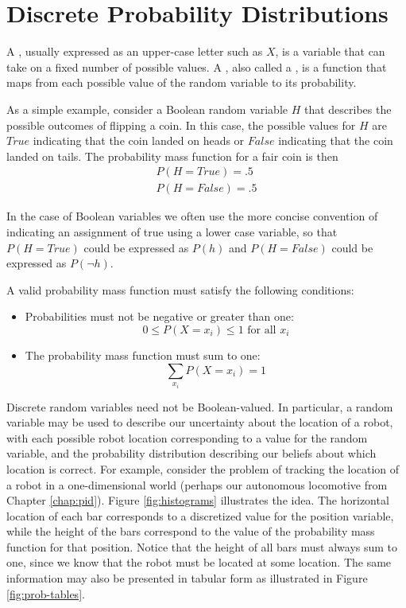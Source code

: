 \section{Discrete Probability Distributions}

A , usually expressed as an upper-case
letter such as $X$, is a variable that can take on a fixed number of
possible values.  A , also called a
, is a function that maps from each
possible value of the random variable to its probability.

As a simple example, consider a Boolean random variable $H$ that
describes the possible outcomes of flipping a coin.  In this case, the
possible values for $H$ are $True$ indicating that the coin landed on
heads or $False$ indicating that the coin landed on tails.  The
probability mass function for a fair coin is then
\begin{align*}
P(H=True) = .5\\
P(H=False) = .5
\end{align*}

In the case of Boolean variables we often use the
more concise convention of indicating an assignment of true using a
lower case variable, so that $P(H=True)$ could be expressed as $P(h)$
and $P(H=False)$ could be expressed as $P(\neg h)$.

A valid probability mass function must satisfy the following
conditions:

\begin{itemize}
\item Probabilities must not be negative or greater than one:
  \[0 \leq P(X = {x_i}) \leq 1 \text{ for all } x_i\]
\item The probability mass function must sum to one:
  \[\sum_{x_i} P(X = {x_i}) = 1\]
\end{itemize}

Discrete random variables need not be Boolean-valued.  In particular,
a random variable may be used to describe our uncertainty about the
location of a robot, with each possible robot location corresponding
to a value for the random variable, and the probability distribution
describing our beliefs about which location is correct. For example,
consider the problem of tracking the location of a robot in a
one-dimensional world (perhaps our autonomous locomotive from Chapter
\ref{chap:pid}).  Figure \ref{fig:histograms} illustrates the idea.
The horizontal location of each bar corresponds to a discretized value
for the position variable, while the height of the bars correspond to
the value of the probability mass function for that position. Notice
that the height of all bars must always sum to one, since we know that
the robot must be located at some location.  The same information may
also be presented in tabular form as illustrated in Figure
\ref{fig:prob-tables}.

